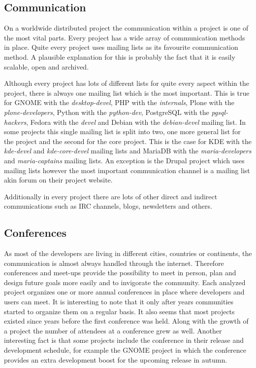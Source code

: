 
\subsection{Communication} %

On a worldwide distributed project the communication within a project is one of
the most vital parts. Every project has a wide array of communication methods
in place. Quite every project uses mailing lists as its favourite communication
method. A plausible explanation for this is probably the fact that it is easily
scalable, open and archived.

Although every project has lots of different lists for quite every aspect
within the project, there is always one mailing list which is the most
important. This is true for GNOME with the \emph{desktop-devel}, PHP with the
\emph{internals}, Plone with the \emph{plone-developers}, Python with the
\emph{python-dev}, PostgreSQL with the \emph{pgsql-hackers}, Fedora with the
\emph{devel} and Debian with the \emph{debian-devel} mailing list. In some
projects this single mailing list is split into two, one more general list for
the project and the second for the core project. This is the case for KDE with
the \emph{kde-devel} and \emph{kde-core-devel} mailing lists and MariaDB with
the \emph{maria-developers} and \emph{maria-captains} mailing lists. An
exception is the Drupal project which uses mailing lists however the most
important communication channel is a mailing list akin forum on their project
website.

Additionally in every project there are lots of other direct and indirect
communications such as \ac{IRC} channels, blogs, newsletters and others.


\subsection{Conferences} %

As most of the developers are living in different cities, countries or
continents, the communication is almost always handled through the internet.
Therefore conferences and meet-ups provide the possibility to meet in person,
plan and design future goals more easily and to invigorate the community. Each
analyzed project organizes one or more annual conferences in place where
developers and users can meet. It is interesting to note that it only after
years communities started to organize them on a regular basis. It also seems
that most projects existed since years before the first conference was held.
Along with the growth of a project the number of attendees at a conference grew
as well. Another interesting fact is that some projects include the conference
in their release and development schedule, for example the GNOME project in
which the conference provides an extra development boost for the upcoming
release in autumn.

